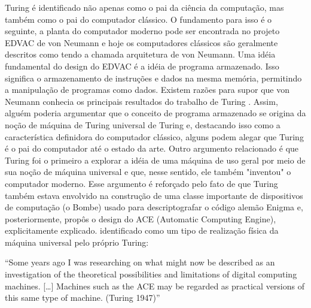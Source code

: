 Turing é identificado não apenas como o pai da ciência da computação, mas também como o pai do computador clássico. O fundamento para isso é o seguinte, a planta do computador moderno pode ser encontrada no projeto EDVAC de von Neumann \cite{9} e hoje os computadores clássicos são geralmente descritos como tendo a chamada arquitetura de von Neumann. Uma idéia fundamental do design do EDVAC é a idéia de programa armazenado. Isso significa o armazenamento de instruções e dados na mesma memória, permitindo a manipulação de programas como dados. Existem razões para supor que von Neumann conhecia os principais resultados do trabalho de Turing \cite{10}. Assim, alguém poderia argumentar que o conceito de programa armazenado se origina da noção de máquina de Turing universal de Turing e, destacando isso como a característica definidora do computador clássico, alguns podem alegar que Turing é o pai do computador até o estado da arte. Outro argumento relacionado é que Turing foi o primeiro a explorar a idéia de uma máquina de uso geral por meio de sua noção de máquina universal e que, nesse sentido, ele também "inventou" o computador moderno. Esse argumento é reforçado pelo fato de que Turing também estava envolvido na construção de uma classe importante de dispositivos de computação (o Bombe) usado para descriptografar o código alemão Enigma e, posteriormente, propôs o design do ACE (Automatic Computing Engine), explicitamente explicado. identificado como um tipo de realização física da máquina universal pelo próprio Turing:

``Some years ago I was researching on what might now be described as an investigation of the theoretical possibilities and limitations of digital computing machines. […] Machines such as the ACE may be regarded as practical versions of this same type of machine. (Turing 1947)''
\newpage
